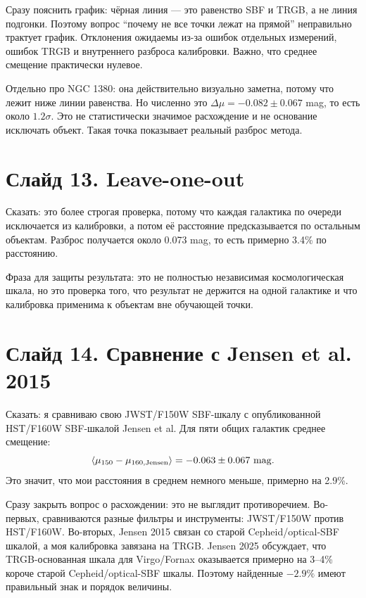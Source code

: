 \documentclass[12pt]{article}
\begin{document}
Сразу пояснить график: чёрная линия --- это равенство SBF и TRGB, а не линия подгонки. Поэтому вопрос ``почему не все точки лежат на прямой'' неправильно трактует график. Отклонения ожидаемы из-за ошибок отдельных измерений, ошибок TRGB и внутреннего разброса калибровки. Важно, что среднее смещение практически нулевое.

Отдельно про NGC 1380: она действительно визуально заметна, потому что лежит ниже линии равенства. Но численно это $\Delta\mu=-0.082\pm0.067$ mag, то есть около $1.2\sigma$. Это не статистически значимое расхождение и не основание исключать объект. Такая точка показывает реальный разброс метода.

\section*{Слайд 13. Leave-one-out}

Сказать: это более строгая проверка, потому что каждая галактика по очереди исключается из калибровки, а потом её расстояние предсказывается по остальным объектам. Разброс получается около 0.073 mag, то есть примерно 3.4\% по расстоянию.

Фраза для защиты результата: это не полностью независимая космологическая шкала, но это проверка того, что результат не держится на одной галактике и что калибровка применима к объектам вне обучающей точки.

\section*{Слайд 14. Сравнение с Jensen et al. 2015}

Сказать: я сравниваю свою JWST/F150W SBF-шкалу с опубликованной HST/F160W SBF-шкалой Jensen et al. Для пяти общих галактик среднее смещение:
\begin{equation*}
    \langle\mu_{150}-\mu_{160,\rm Jensen}\rangle=-0.063\pm0.067~\mathrm{mag}.
\end{equation*}
Это значит, что мои расстояния в среднем немного меньше, примерно на 2.9\%.

Сразу закрыть вопрос о расхождении: это не выглядит противоречием. Во-первых, сравниваются разные фильтры и инструменты: JWST/F150W против HST/F160W. Во-вторых, Jensen 2015 связан со старой Cepheid/optical-SBF шкалой, а моя калибровка завязана на TRGB. Jensen 2025 обсуждает, что TRGB-основанная шкала для Virgo/Fornax оказывается примерно на 3--4\% короче старой Cepheid/optical-SBF шкалы. Поэтому найденные $-2.9\%$ имеют правильный знак и порядок величины.
\end{document}
